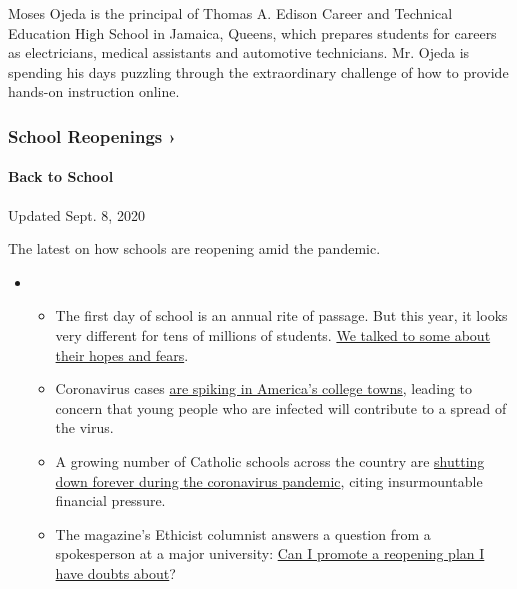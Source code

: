 Moses Ojeda is the principal of Thomas A. Edison Career and Technical
Education High School in Jamaica, Queens, which prepares students for
careers as electricians, medical assistants and automotive technicians.
Mr. Ojeda is spending his days puzzling through the extraordinary
challenge of how to provide hands-on instruction online.

\href{https://www.nytimes3xbfgragh.onion/spotlight/schools-reopening?action=click\&pgtype=Article\&state=default\&region=MAIN_CONTENT_3\&context=storylines_keepup}{}

\hypertarget{school-reopenings-}{%
\subsubsection{School Reopenings ›}\label{school-reopenings-}}

\hypertarget{back-to-school}{%
\paragraph{Back to School}\label{back-to-school}}

Updated Sept. 8, 2020

The latest on how schools are reopening amid the pandemic.

\begin{itemize}
\item
  \begin{itemize}
  \tightlist
  \item
    The first day of school is an annual rite of passage. But this year,
    it looks very different for tens of millions of students.
    \href{https://www.nytimes3xbfgragh.onion/2020/09/05/us/virtual-return-to-school-covid.html?action=click\&pgtype=Article\&state=default\&region=MAIN_CONTENT_3\&context=storylines_keepup}{We
    talked to some about their hopes and fears}.
  \item
    Coronavirus cases
    \href{https://www.nytimes3xbfgragh.onion/2020/09/06/us/colleges-coronavirus-students.html?action=click\&pgtype=Article\&state=default\&region=MAIN_CONTENT_3\&context=storylines_keepup}{are
    spiking in America's college towns}, leading to concern that young
    people who are infected will contribute to a spread of the virus.
  \item
    A growing number of Catholic schools across the country are
    \href{https://www.nytimes3xbfgragh.onion/2020/09/05/us/catholic-school-closings.html?action=click\&pgtype=Article\&state=default\&region=MAIN_CONTENT_3\&context=storylines_keepup}{shutting
    down forever during the coronavirus pandemic}, citing insurmountable
    financial pressure.
  \item
    The magazine's Ethicist columnist answers a question from a
    spokesperson at a major university:
    \href{https://www.nytimes3xbfgragh.onion/2020/09/08/magazine/university-reopening-safety-ethics.html?action=click\&pgtype=Article\&state=default\&region=MAIN_CONTENT_3\&context=storylines_keepup}{Can
    I promote a reopening plan I have doubts about}?
  \end{itemize}
\end{itemize}

